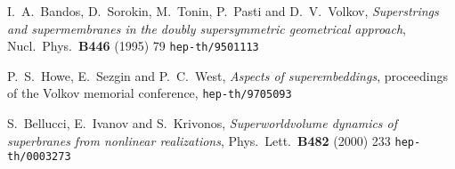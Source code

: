 \documentclass[12pt,a4paper]{article}
\begin{document}
\begin{thebibliography}{99}
I.~A.~Bandos, D.~Sorokin, M.~Tonin, P.~Pasti and D.~V.~Volkov,
{\it Superstrings and supermembranes in the doubly supersymmetric 
geometrical approach},
Nucl.\ Phys.\  {\bf B446} (1995) 79
{\tt hep-th/9501113}

P.~S.~Howe, E.~Sezgin and P.~C.~West,
{\it Aspects of superembeddings},
proceedings of the Volkov memorial conference,
{\tt hep-th/9705093}



S.~Bellucci, E.~Ivanov and S.~Krivonos,
{\it Superworldvolume dynamics of superbranes from nonlinear realizations},
Phys.\ Lett.\  {\bf B482} (2000) 233
{\tt hep-th/0003273}


\end{thebibliography}
\end{document}
